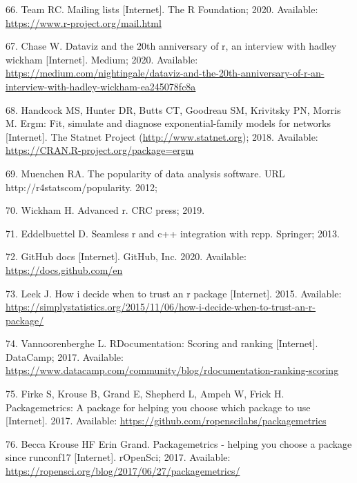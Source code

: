 \documentclass[10pt,letterpaper]{article}
\begin{document}
\leavevmode\hypertarget{ref-Rmail2020}{}%
66. Team RC. Mailing lists {[}Internet{]}. The R Foundation; 2020.
Available: \url{https://www.r-project.org/mail.html}

\leavevmode\hypertarget{ref-chase2020}{}%
67. Chase W. Dataviz and the 20th anniversary of r, an interview with
hadley wickham {[}Internet{]}. Medium; 2020. Available:
\url{https://medium.com/nightingale/dataviz-and-the-20th-anniversary-of-r-an-interview-with-hadley-wickham-ea245078fc8a}

\leavevmode\hypertarget{ref-statnet}{}%
68. Handcock MS, Hunter DR, Butts CT, Goodreau SM, Krivitsky PN, Morris
M. Ergm: Fit, simulate and diagnose exponential-family models for
networks {[}Internet{]}. The Statnet Project
(\url{http://www.statnet.org}); 2018. Available:
\url{https://CRAN.R-project.org/package=ergm}

\leavevmode\hypertarget{ref-muenchen2012}{}%
69. Muenchen RA. The popularity of data analysis software. URL
http://r4statscom/popularity. 2012;

\leavevmode\hypertarget{ref-wickham2019}{}%
70. Wickham H. Advanced r. CRC press; 2019.

\leavevmode\hypertarget{ref-eddelbuettel2013}{}%
71. Eddelbuettel D. Seamless r and c++ integration with rcpp. Springer;
2013.

\leavevmode\hypertarget{ref-githubdocs}{}%
72. GitHub docs {[}Internet{]}. GitHub, Inc. 2020. Available:
\url{https://docs.github.com/en}

\leavevmode\hypertarget{ref-leek2015}{}%
73. Leek J. How i decide when to trust an r package {[}Internet{]}.
2015. Available:
\url{https://simplystatistics.org/2015/11/06/how-i-decide-when-to-trust-an-r-package/}

\leavevmode\hypertarget{ref-vannoorenberghe2017}{}%
74. Vannoorenberghe L. RDocumentation: Scoring and ranking
{[}Internet{]}. DataCamp; 2017. Available:
\url{https://www.datacamp.com/community/blog/rdocumentation-ranking-scoring}

\leavevmode\hypertarget{ref-packagemetrics}{}%
75. Firke S, Krouse B, Grand E, Shepherd L, Ampeh W, Frick H.
Packagemetrics: A package for helping you choose which package to use
{[}Internet{]}. 2017. Available:
\url{https://github.com/ropenscilabs/packagemetrics}

\leavevmode\hypertarget{ref-packagemetricsblog}{}%
76. Becca Krouse HF Erin Grand. Packagemetrics - helping you choose a
package since runconf17 {[}Internet{]}. rOpenSci; 2017. Available:
\url{https://ropensci.org/blog/2017/06/27/packagemetrics/}
\end{document}
